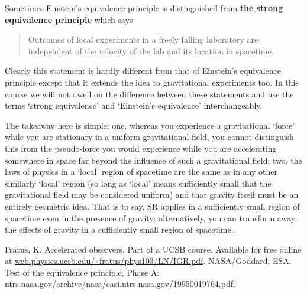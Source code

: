 \documentclass[english,seminar]{lecture}
\begin{document}
Sometimes Einstein's equivalence principle is distinguished from \textbf{the strong equivalence principle} which says
\begin{quote}
	Outcomes of local experiments in a freely falling laboratory are independent of the velocity of the lab and its location in spacetime.
\end{quote}
Clearly this statement is hardly different from that of Einstein's equivalence principle except that it extends the idea to gravitational experiments too. In this course we will not dwell on the difference between these statements and use the terms `strong equivalence' and `Einstein's equivalence' interchangeably.

The takeaway here is simple: one, whereas you experience a gravitational `force' while you are stationary in a uniform gravitational field, you cannot distinguish this from the pseudo-force you would experience while you are accelerating somewhere in space far beyond the influence of such a gravitational field; two, the laws of physics in a `local' region of spacetime are the same as in any other similarly `local' region (so long as `local' means sufficiently small that the gravitational field may be considered uniform) and that gravity itself must be an entirely geometric idea. That is to say, SR applies in a sufficiently small region of spacetime even in the presence of gravity; alternatively, you can transform away the effects of gravity in a sufficiently small region of spacetime.

\begin{thebibliography}{1}
	Fratus, K. Accelerated observers. Part of a UCSB course. Available for free online at \url{web.physics.ucsb.edu/~fratus/phys103/LN/IGR.pdf}.
	NASA/Goddard, ESA. Test of the equivalence principle, Phase A: \url{ntrs.nasa.gov/archive/nasa/casi.ntrs.nasa.gov/19950019764.pdf}.
\end{thebibliography}
\end{document}
